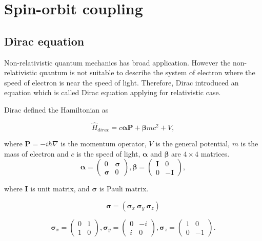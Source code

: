 \documentclass[a4paper, 12pt, titlepage,oneside,drop]{kthesis}
\begin{document}
\section{Spin-orbit coupling}
\label{srasoc}

\subsection{Dirac equation}

Non-relativistic quantum mechanics has broad application. However the non-relativistic quantum is not suitable to describe the system of electron where the speed of electron is near the speed of light. Therefore, Dirac introduced an equation which is called
Dirac equation applying for relativistic case.

\noindent Dirac defined the Hamiltonian as

\begin{equation}\label{dirac}
\hat{H}_\textit{dirac} = c \boldsymbol{\alpha} \textbf{P} + \boldsymbol{\beta}mc^{2} + V,
\end{equation}

\noindent where $\textbf{P} = -i\hbar \nabla $ is the momentum operator, $V$ is the general potential, $m$ is the mass of electron 
and $c$ is the speed of light, $\boldsymbol{\alpha}$ and $\boldsymbol{\beta}$ are $4 \times 4$ matrices.
\begin{equation}
 \boldsymbol{\alpha} = \left( \begin{array}{cc}
 0 & \boldsymbol{\sigma}  \\
 \boldsymbol{\sigma} & 0   \end{array} \right),
\boldsymbol{\beta}= \left( \begin{array}{ccc}
\boldsymbol{I} & 0\\
0 & -\boldsymbol{I}\end{array} \right),
\end{equation}

\noindent where $\boldsymbol{I}$ is unit matrix, and $\boldsymbol{\sigma}$ is Pauli matrix.

\begin{equation} 
\boldsymbol{\sigma} = (\boldsymbol{\sigma}_x \  \boldsymbol{\sigma}_y \  \boldsymbol{\sigma}_z )  
\end{equation}

\begin{equation}
\boldsymbol{\sigma}_x= \left( \begin{array}{cc}
0 & 1\\
1 & 0\end{array} \right),
\boldsymbol{\sigma}_y= \left( \begin{array}{ccc}
0 & -i\\
i & 0\end{array} \right),
\boldsymbol{\sigma}_z= \left( \begin{array}{ccc}
1 & 0\\
0 & -1\end{array} \right).
\end{equation}
\end{document}
